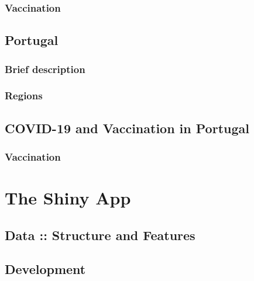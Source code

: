 \documentclass[11pt,a4paper]{report}
\begin{document}


\subsection{Vaccination}



\section{Portugal}

\subsection{Brief description}


\subsection{Regions}






\section{COVID-19 and Vaccination in Portugal}



\subsection{Vaccination}






\chapter{The Shiny App}

\section{Data :: Structure and Features}



\section{Development}

\end{document}
